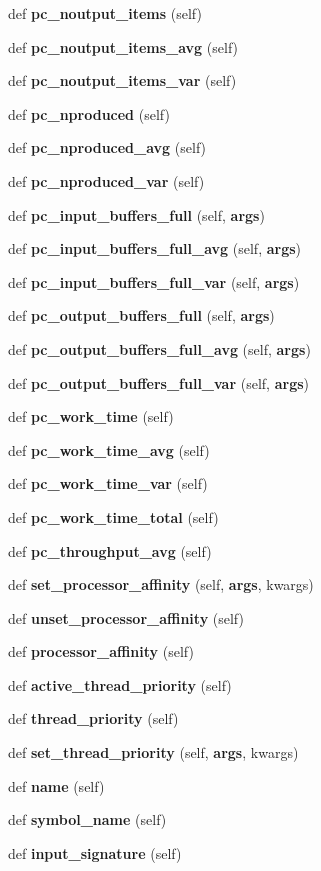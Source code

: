 \begin{DoxyCompactItemize}
\item 
def {\bf pc\+\_\+noutput\+\_\+items} (self)
\item 
def {\bf pc\+\_\+noutput\+\_\+items\+\_\+avg} (self)
\item 
def {\bf pc\+\_\+noutput\+\_\+items\+\_\+var} (self)
\item 
def {\bf pc\+\_\+nproduced} (self)
\item 
def {\bf pc\+\_\+nproduced\+\_\+avg} (self)
\item 
def {\bf pc\+\_\+nproduced\+\_\+var} (self)
\item 
def {\bf pc\+\_\+input\+\_\+buffers\+\_\+full} (self, {\bf args})
\item 
def {\bf pc\+\_\+input\+\_\+buffers\+\_\+full\+\_\+avg} (self, {\bf args})
\item 
def {\bf pc\+\_\+input\+\_\+buffers\+\_\+full\+\_\+var} (self, {\bf args})
\item 
def {\bf pc\+\_\+output\+\_\+buffers\+\_\+full} (self, {\bf args})
\item 
def {\bf pc\+\_\+output\+\_\+buffers\+\_\+full\+\_\+avg} (self, {\bf args})
\item 
def {\bf pc\+\_\+output\+\_\+buffers\+\_\+full\+\_\+var} (self, {\bf args})
\item 
def {\bf pc\+\_\+work\+\_\+time} (self)
\item 
def {\bf pc\+\_\+work\+\_\+time\+\_\+avg} (self)
\item 
def {\bf pc\+\_\+work\+\_\+time\+\_\+var} (self)
\item 
def {\bf pc\+\_\+work\+\_\+time\+\_\+total} (self)
\item 
def {\bf pc\+\_\+throughput\+\_\+avg} (self)
\item 
def {\bf set\+\_\+processor\+\_\+affinity} (self, {\bf args}, kwargs)
\item 
def {\bf unset\+\_\+processor\+\_\+affinity} (self)
\item 
def {\bf processor\+\_\+affinity} (self)
\item 
def {\bf active\+\_\+thread\+\_\+priority} (self)
\item 
def {\bf thread\+\_\+priority} (self)
\item 
def {\bf set\+\_\+thread\+\_\+priority} (self, {\bf args}, kwargs)
\item 
def {\bf name} (self)
\item 
def {\bf symbol\+\_\+name} (self)
\item 
def {\bf input\+\_\+signature} (self)
\item 

\end{DoxyCompactItemize}
